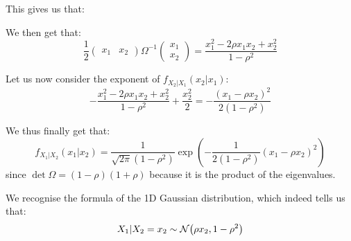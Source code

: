 \documentclass[a4paper]{article}
\begin{document}
{{        This gives us that: 
        
        We then get that: 
        \[\frac{1}{2}\begin{pmatrix} x_1 & x_2 \end{pmatrix} \Omega^{-1} \begin{pmatrix} x_1 \\ x_2 \end{pmatrix} = \frac{x_1^2  - 2\rho x_1 x_2 + x_2^2}{1 - \rho^2} \]

        Let us now consider the exponent of $f_{X_2|X_1}\left(x_2|x_1\right)$: 
        \[-\frac{x_1^2  - 2\rho x_1 x_2 + x_2^2}{1 - \rho^2} + \frac{x_2^2}{2} = -\frac{\left(x_1 - \rho x_2\right)^2}{2\left(1 - \rho^2\right)}\]
        
        We thus finally get that: 
        \[f_{X_1|X_2}\left(x_1|x_2\right) = \frac{1}{\sqrt{2\pi} \left(1 - \rho^2\right)} \exp\left(-\frac{1}{2\left(1 - \rho^2\right)}\left(x_1 - \rho x_2\right)^2\right)\]
        since $\det \Omega = \left(1 - \rho\right)\left(1 + \rho\right)$ because it is the product of the eigenvalues.

        We recognise the formula of the 1D Gaussian distribution, which indeed tells us that:
        \[X_1 | X_2 = x_2 \followsdistr \mathcal{N}\left(\rho x_2, 1- \rho^2\right)\]
        
    }
}
\end{document}
